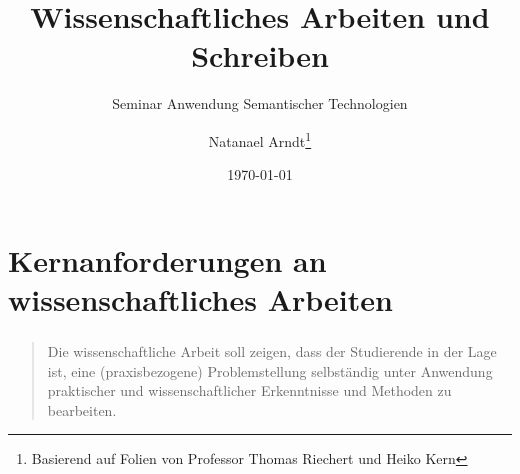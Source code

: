 \documentclass[aspectratio=169]{beamer}
\title{Wissenschaftliches Arbeiten und Schreiben}
\subtitle{Seminar Anwendung Semantischer Technologien}
\author[Natanael Arndt]{Natanael Arndt\footnote{Basierend auf Folien von Professor Thomas Riechert und Heiko Kern}}
\date{\today}
\institute{Betriebliche Informationssysteme}
\begin{document}
\begin{frame} %
        \maketitle
\end{frame}

\section{Kernanforderungen an wissenschaftliches Arbeiten}
\begin{frame}
  \frametitle{\insertsection}%
  \framesubtitle{\insertsubsection}%
  
  \begin{quote}
   Die wissenschaftliche Arbeit soll zeigen, dass der Studierende in der Lage ist, eine (praxisbezogene) Problemstellung selbständig unter Anwendung praktischer und wissenschaftlicher Erkenntnisse und Methoden zu bearbeiten.
  \end{quote}
\end{frame}
\end{document}
